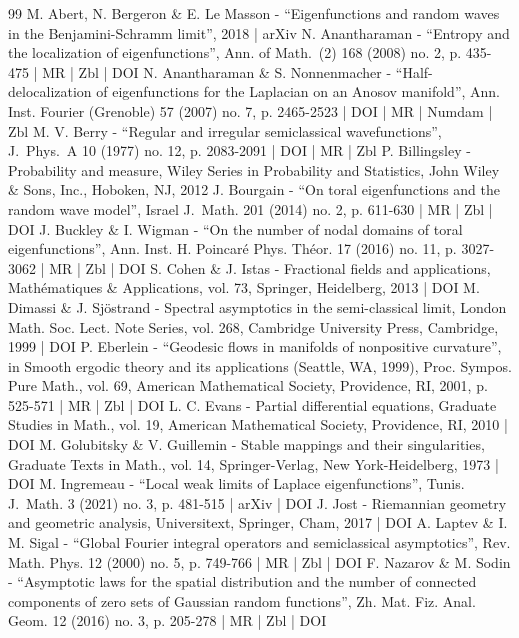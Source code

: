 \documentclass[10pt]{amsart}
\theoremstyle{plain}
\theoremstyle{definition}
\begin{document}
\begin{thebibliography}{99}
M. Abert, N. Bergeron \& E. Le Masson - “Eigenfunctions and random waves in the Benjamini-Schramm limit”, 2018 | arXiv
N. Anantharaman - “Entropy and the localization of eigenfunctions”, Ann. of Math. (2) 168 (2008) no. 2, p. 435-475 | MR | Zbl | DOI
N. Anantharaman \& S. Nonnenmacher - “Half-delocalization of eigenfunctions for the Laplacian on an Anosov manifold”, Ann. Inst. Fourier (Grenoble) 57 (2007) no. 7, p. 2465-2523 | DOI | MR | Numdam | Zbl
M. V. Berry - “Regular and irregular semiclassical wavefunctions”, J. Phys. A 10 (1977) no. 12, p. 2083-2091 | DOI | MR | Zbl
P. Billingsley - Probability and measure, Wiley Series in Probability and Statistics, John Wiley \& Sons, Inc., Hoboken, NJ, 2012
J. Bourgain - “On toral eigenfunctions and the random wave model”, Israel J. Math. 201 (2014) no. 2, p. 611-630 | MR | Zbl | DOI
J. Buckley \& I. Wigman - “On the number of nodal domains of toral eigenfunctions”, Ann. Inst. H. Poincaré Phys. Théor. 17 (2016) no. 11, p. 3027-3062 | MR | Zbl | DOI
S. Cohen \& J. Istas - Fractional fields and applications, Mathématiques \& Applications, vol. 73, Springer, Heidelberg, 2013 | DOI
M. Dimassi \& J. Sjöstrand - Spectral asymptotics in the semi-classical limit, London Math. Soc. Lect. Note Series, vol. 268, Cambridge University Press, Cambridge, 1999 | DOI
P. Eberlein - “Geodesic flows in manifolds of nonpositive curvature”, in Smooth ergodic theory and its applications (Seattle, WA, 1999), Proc. Sympos. Pure Math., vol. 69, American Mathematical Society, Providence, RI, 2001, p. 525-571 | MR | Zbl | DOI
L. C. Evans - Partial differential equations, Graduate Studies in Math., vol. 19, American Mathematical Society, Providence, RI, 2010 | DOI
M. Golubitsky \& V. Guillemin - Stable mappings and their singularities, Graduate Texts in Math., vol. 14, Springer-Verlag, New York-Heidelberg, 1973 | DOI
M. Ingremeau - “Local weak limits of Laplace eigenfunctions”, Tunis. J. Math. 3 (2021) no. 3, p. 481-515 | arXiv | DOI
J. Jost - Riemannian geometry and geometric analysis, Universitext, Springer, Cham, 2017 | DOI
A. Laptev \& I. M. Sigal - “Global Fourier integral operators and semiclassical asymptotics”, Rev. Math. Phys. 12 (2000) no. 5, p. 749-766 | MR | Zbl | DOI
F. Nazarov \& M. Sodin - “Asymptotic laws for the spatial distribution and the number of connected components of zero sets of Gaussian random functions”, Zh. Mat. Fiz. Anal. Geom. 12 (2016) no. 3, p. 205-278 | MR | Zbl | DOI

\end{thebibliography}
\end{document}
